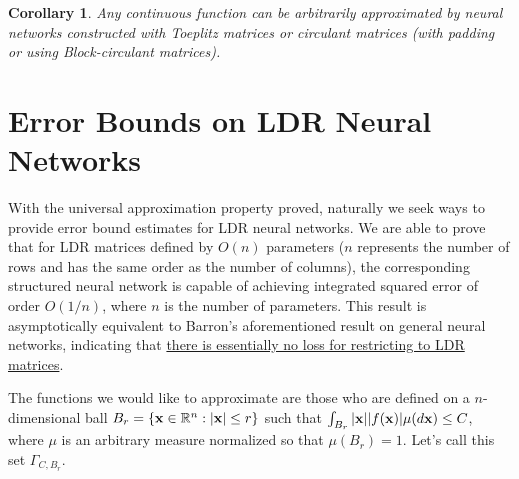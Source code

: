 \documentclass{article}
\newtheorem{coro}{Corollary}[section]
\begin{document}
\begin{coro}
Any continuous function can be arbitrarily approximated by neural networks constructed with Toeplitz matrices or circulant matrices (with padding or using Block-circulant matrices).
\end{coro}

\section{Error Bounds on LDR Neural Networks}
\label{seb}
With the universal approximation property proved, naturally we seek ways to provide error bound estimates for LDR neural networks. We are able to prove that for LDR matrices defined by $O(n)$ parameters ($n$ represents the number of rows and has the same order as the number of columns), the corresponding structured neural network is capable of achieving integrated squared error of order $O(1/n)$, where $n$ is the number of parameters. This result is asymptotically equivalent to Barron's aforementioned result on general neural networks, indicating that \underline{there is essentially no loss for restricting to LDR matrices}.

The functions we would like to approximate are those who are defined on a $n$-dimensional ball $B_r = \{{\bf x}\in\mathbb{R}^n: |{\bf x}|\le r\}$ such that $\int_{B_r}|{\bf x}||f({\bf x})|\mu(d{\bf x})\le C$, where $\mu$ is an arbitrary measure normalized so that $\mu(B_r)=1$. Let's call this set $\Gamma_{C, B_r}$.
\end{document}

